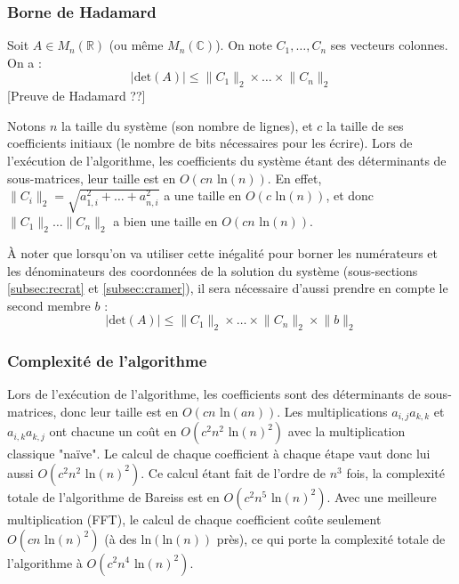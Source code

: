 \documentclass[french]{article}
\begin{document}
\subsubsection{Borne de Hadamard} \label{subsubsec:hada}
Soit $A \in M_n(\mathbb{R})$ (ou même $M_n(\mathbb{C})$). On note $C_1,\hdots,C_n$ ses vecteurs colonnes. On a :
$$ \lvert \mbox{det}(A) \rvert \le \lVert C_1 \rVert_2 \times \hdots \times \lVert C_n \rVert_2$$
[Preuve de Hadamard ??]
\par
Notons $n$ la taille du système (son nombre de lignes), et $c$ la taille de ses coefficients initiaux (le nombre de bits nécessaires pour les écrire). Lors de l'exécution de l'algorithme, les coefficients du système étant des déterminants de sous-matrices, leur taille est en $O(cn \mbox{ ln}(n))$.
\newline
En effet, $\lVert C_i \rVert_2 = \sqrt{a_{1,i}^2 + \hdots + a_{n,i}^2}$ a une taille en $O(c\mbox{ ln}(n))$, et donc $\lVert C_1 \rVert_2 \hdots \lVert C_n \rVert_2$ a bien une taille en $O(cn \mbox{ ln}(n))$.
\par
À noter que lorsqu'on va utiliser cette inégalité pour borner les numérateurs et les dénominateurs des coordonnées de la solution du système (sous-sections \ref{subsec:recrat} et \ref{subsec:cramer}), il sera nécessaire d'aussi prendre en compte le second membre $b$ :
$$ \lvert \mbox{det}(A) \rvert \le \lVert C_1 \rVert_2 \times \hdots \times \lVert C_n \rVert_2 \times \lVert b \rVert_2$$
\subsubsection{Complexité de l'algorithme}
 Lors de l'exécution de l'algorithme, les coefficients sont des déterminants de sous-matrices, donc leur taille est en $O(cn \mbox{ ln}(a n))$. Les multiplications $a_{i,j} a_{k,k}$ et $a_{i,k} a_{k,j}$ ont chacune un coût en $O(c^2 n^2 \mbox{ ln}(n)^2)$ avec la multiplication classique "naïve". Le calcul de chaque coefficient à chaque étape vaut donc lui aussi $O(c^2 n^2 \mbox{ ln}(n)^2)$. Ce calcul étant fait de l'ordre de $n^3$ fois, la complexité totale de l'algorithme de Bareiss est en $O(c^2 n^5 \mbox{ ln}(n)^2)$. Avec une meilleure multiplication (FFT), le calcul de chaque coefficient coûte seulement $O(cn \mbox{ ln}(n)^2)$ (à des $\mbox{ln}(\mbox{ln}(n))$ près), ce qui porte la complexité totale de l'algorithme à $O(c^2 n^4 \mbox{ ln}(n)^2)$.
\end{document}
